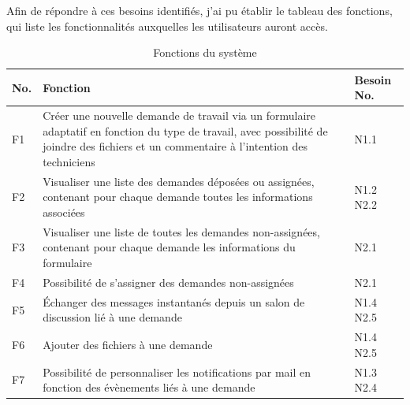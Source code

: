 \documentclass[
    iai, %
    eai, %
]{heig-tb}
\begin{document}
\newpage
Afin de répondre à ces besoins identifiés, j'ai pu établir le tableau des fonctions, qui liste les fonctionnalités auxquelles les utilisateurs auront accès.

\begin{table}[h]
  \begin{center}
    \caption{Fonctions du système}
    \begin{tabularx}{\textwidth}[t]{p{0.5cm}Xp{1cm}}
      No. & Fonction                                                                                                                                                                                   & Besoin No.         \\ \toprule
      F1  & Créer une nouvelle demande de travail via un formulaire adaptatif en fonction du type de travail, avec possibilité de joindre des fichiers et un commentaire à l'intention des techniciens & N1.1               \\ \midrule
      F2  & Visualiser une liste des demandes déposées ou assignées, contenant pour chaque demande toutes les informations associées                                                                   & N1.2 \newline N2.2 \\ \midrule
      F3  & Visualiser une liste de toutes les demandes non-assignées, contenant pour chaque demande les informations du formulaire                                                                    & N2.1               \\ \midrule
      F4  & Possibilité de s'assigner des demandes non-assignées                                                                                                                                       & N2.1               \\ \midrule
      F5  & Échanger des messages instantanés depuis un salon de discussion lié à une demande                                                                                                          & N1.4 \newline N2.5 \\ \midrule
      F6  & Ajouter des fichiers à une demande                                                                                                                                                         & N1.4 \newline N2.5 \\ \midrule
      F7  & Possibilité de personnaliser les notifications par mail en fonction des évènements liés à une demande                                                                                      & N1.3 \newline N2.4 \\ \midrule

\end{tabularx}
\end{center}
\end{table}
\end{document}
